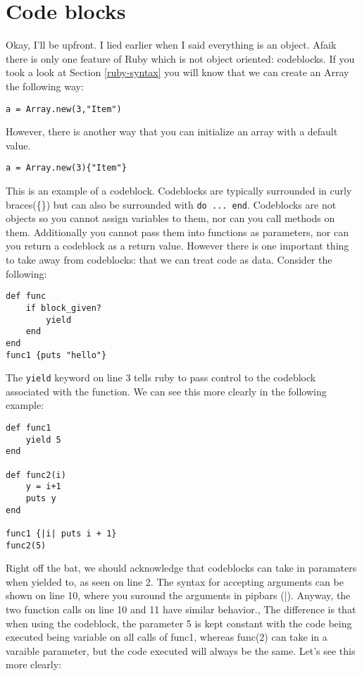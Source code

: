 \documentclass[main.tex]{subfiles}
\begin{document}
\section{Code blocks}
Okay, I'll be upfront. I lied earlier when I said everything is an object. Afaik there is only one feature of Ruby which is not object oriented: codeblocks. If you took a look at Section \ref{ruby-syntax} you will know that we can create an Array the following way: 
\begin{lstlisting}[style=MyRubyStyle]
a = Array.new(3,"Item")
\end{lstlisting}
However, there is another way that you can initialize an array with a default value.
\begin{lstlisting}[style=MyRubyStyle]
a = Array.new(3){"Item"}
\end{lstlisting}
This is an example of a codeblock. Codeblocks are typically surrounded in curly braces(\{\}) but can also be surrounded with \texttt{do ... end}.
Codeblocks are not objects so you cannot assign variables to them, nor can you call methods on them. 
Additionally you cannot pass them into functions as parameters, nor can you return a codeblock as a return value. 
However there is one important thing to take away from codeblocks: that we can treat code as data. 
Consider the following:
\begin{lstlisting}[style=MyRubyStyle]
def func
    if block_given?
        yield
    end
end
func1 {puts "hello"}
\end{lstlisting}
The \texttt{yield} keyword on line 3 tells ruby to pass control to the codeblock associated with the function. 
We can see this more clearly in the following example:
\begin{lstlisting}[style=MyRubyStyle]
def func1
    yield 5
end

def func2(i)
    y = i+1
    puts y
end

func1 {|i| puts i + 1}
func2(5) 
\end{lstlisting}
Right off the bat, we should acknowledge that codeblocks can take in paramaters when yielded to, as seen on line 2. 
The syntax for accepting arguments can be shown on line 10, where you suround the arguments in pipbars (|). 
Anyway, the two function calls on line 10 and 11 have similar behavior., The difference is that when using the codeblock,
the parameter 5 is kept constant with the code being executed being variable on all calls of func1, whereas func(2) can take in a varaible parameter, but the code executed will always be the same. 
Let's see this more clearly:
\end{document}
